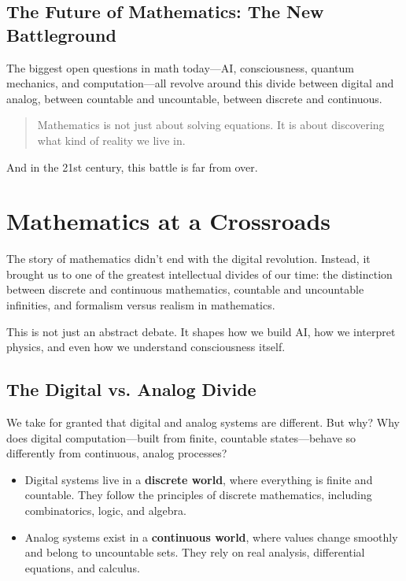 \subsection{The Future of Mathematics: The New Battleground}

The biggest open questions in math today—AI, consciousness, quantum mechanics, and computation—all revolve around this divide between digital and analog, between countable and uncountable, between discrete and continuous.

\begin{quote}
Mathematics is not just about solving equations. It is about discovering what kind of reality we live in.
\end{quote}

And in the 21st century, this battle is far from over.







\section{Mathematics at a Crossroads}

The story of mathematics didn’t end with the digital revolution. Instead, it brought us to one of the greatest intellectual divides of our time: the distinction between discrete and continuous mathematics, countable and uncountable infinities, and formalism versus realism in mathematics.

This is not just an abstract debate. It shapes how we build AI, how we interpret physics, and even how we understand consciousness itself.

\subsection{The Digital vs. Analog Divide}

We take for granted that digital and analog systems are different. But why? Why does digital computation—built from finite, countable states—behave so differently from continuous, analog processes?

\begin{itemize}
    \item Digital systems live in a \textbf{discrete world}, where everything is finite and countable. They follow the principles of discrete mathematics, including combinatorics, logic, and algebra.
    \item Analog systems exist in a \textbf{continuous world}, where values change smoothly and belong to uncountable sets. They rely on real analysis, differential equations, and calculus.
\end{itemize}

